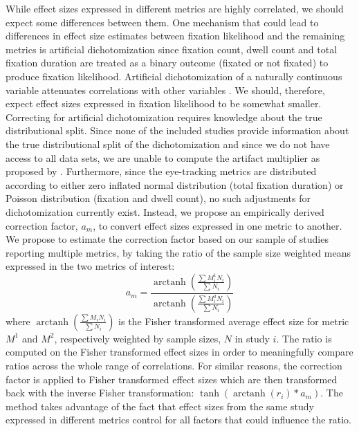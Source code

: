 \documentclass[english,natbib,man,floatsintext]{apa6}
\DeclareMathOperator\arctanh{arctanh}
\begin{document}
While effect sizes expressed in different metrics are highly correlated, we should expect some differences between them. One mechanism that could lead to differences in effect size estimates between fixation likelihood and the remaining metrics is artificial dichotomization since fixation count, dwell count and total fixation duration are treated as a binary outcome (fixated or not fixated) to produce fixation likelihood. Artificial dichotomization of a naturally continuous variable attenuates correlations with other variables \citep{hunter2004a}. We should, therefore, expect effect sizes expressed in fixation likelihood to be somewhat smaller. Correcting for artificial dichotomization requires knowledge about the true distributional split. Since none of the included studies provide information about the true distributional split of the dichotomization and since we do not have access to all data sets, we are unable to compute the artifact multiplier as proposed by \cite{hunter2004a}. Furthermore, since the eye-tracking metrics are distributed according to either zero inflated normal distribution (total fixation duration) or Poisson distribution (fixation and dwell count), no such adjustments for dichotomization currently exist. Instead, we propose an empirically derived correction factor, $a_m$, to convert effect sizes expressed in one metric to another. We propose to estimate the correction factor based on our sample of studies reporting multiple metrics, by taking the ratio of the sample size weighted means expressed in the two metrics of interest:
%
\begin{equation}
\label{eq:metrics_correction}
a_m = \frac{\arctanh \left( \frac{\sum M_i^1 N_i}{\sum N_i} \right)}{\arctanh \left( \frac{\sum M_i^2 N_i}{\sum N_i} \right)}
\end{equation}
%
where $\arctanh \left( \frac{\sum M_i N_i}{\sum N_i} \right)$ is the Fisher transformed average effect size for metric $M^1$ and $M^2$, respectively weighted by sample sizes, $N$ in study $i$. The ratio is computed on the Fisher transformed effect sizes in order to meaningfully compare ratios across the whole range of correlations. For similar reasons, the correction factor is applied to Fisher transformed effect sizes which are then transformed back with the inverse Fisher transformation: $\tanh(\arctanh(r_i)*a_m)$. The method takes advantage of the fact that effect sizes from the same study expressed in different metrics control for all factors that could influence the ratio.    
\end{document}

